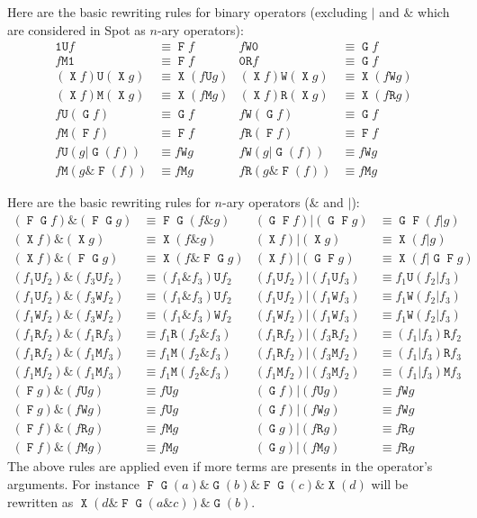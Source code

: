 \documentclass[a4paper,twoside,10pt,DIV=12,draft]{scrreprt}
\DeclareMathOperator{\F}{\texttt{F}}
\DeclareMathOperator{\G}{\texttt{G}}
\newcommand{\U}{\mathbin{\texttt{U}}}
\newcommand{\R}{\mathbin{\texttt{R}}}
\DeclareMathOperator{\X}{\texttt{X}}
\newcommand{\M}{\mathbin{\texttt{M}}}
\newcommand{\W}{\mathbin{\texttt{W}}}
\newcommand{\OR}{\mathbin{\texttt{|}}}
\newcommand{\AND}{\mathbin{\texttt{\&}}}
\newcommand{\0}{\texttt{0}}
\newcommand{\1}{\texttt{1}}
\begin{document}
Here are the basic rewriting rules for binary operators (excluding $\OR$ and
$\AND$ which are considered in Spot as $n$-ary operators):
\begin{align*}
  \1 \U f &\equiv \F f             & f \W \0 &\equiv \G f \\
  f \M \1 &\equiv \F f             & \0 \R f &\equiv \G f \\
  (\X f)\U (\X g) &\equiv \X(f\U g) & (\X f)\W(\X g) &\equiv \X(f\W g) \\
  (\X f)\M (\X g) &\equiv \X(f\M g) & (\X f)\R(\X g) &\equiv \X(f\R g) \\
  f \U(\G f) &\equiv \G f          & f \W(\G f) &\equiv \G f \\
  f \M(\F f) &\equiv \F f          & f \R(\F f) &\equiv \F f \\
  f \U (g \OR \G(f)) &\equiv f\W g & f \W (g \OR \G(f)) &\equiv f\W g\\
  f \M (g \AND \F(f)) &\equiv f\M g & f \R (g \AND \F(f)) &\equiv f\M g
\end{align*}

Here are the basic rewriting rules for $n$-ary operators ($\AND$ and
$\OR$):
\begin{align*}
  (\F\G f) \AND(\F\G g) &\equiv \F\G(f\AND g)     &
  (\G\F f) \OR (\G\F g) &\equiv \G\F(f\OR g)      \\
  (\X f) \AND(\X g)     &\equiv \X(f\AND g)       &
  (\X f) \OR (\X g)     &\equiv \X(f\OR g)        \\
  (\X f) \AND(\F\G g)   &\equiv \X(f\AND \F\G g)  &
  (\X f) \OR (\G\F g)   &\equiv \X(f\OR \G\F g)   \\
  (f_1 \U f_2)\AND (f_3 \U f_2)&\equiv (f_1\AND f_3)\U f_2&
  (f_1 \U f_2)\OR  (f_1 \U f_3)&\equiv f_1\U (f_2\OR f_3) \\
  (f_1 \U f_2)\AND (f_3 \W f_2)&\equiv (f_1\AND f_3)\U f_2&
  (f_1 \U f_2)\OR  (f_1 \W f_3)&\equiv f_1\W (f_2\OR f_3) \\
  (f_1 \W f_2)\AND (f_3 \W f_2)&\equiv (f_1\AND f_3)\W f_2&
  (f_1 \W f_2)\OR  (f_1 \W f_3)&\equiv f_1\W (f_2\OR f_3) \\
  (f_1 \R f_2)\AND (f_1 \R f_3)&\equiv f_1\R (f_2\AND f_3)&
  (f_1 \R f_2)\OR  (f_3 \R f_2)&\equiv (f_1\OR f_3) \R f_2\\
  (f_1 \R f_2)\AND (f_1 \M f_3)&\equiv f_1\M (f_2\AND f_3)&
  (f_1 \R f_2)\OR  (f_3 \M f_2)&\equiv (f_1\OR f_3) \R f_3\\
  (f_1 \M f_2)\AND (f_1 \M f_3)&\equiv f_1\M (f_2\AND f_3)&
  (f_1 \M f_2)\OR  (f_3 \M f_2)&\equiv (f_1\OR f_3) \M f_3\\
  (\F g)\AND (f \U g)&\equiv f\U g &
  (\G f)\OR  (f \U g)&\equiv f\W g \\
  (\F g)\AND (f \W g)&\equiv f\U g &
  (\G f)\OR  (f \W g)&\equiv f\W g \\
  (\F f)\AND (f \R g)&\equiv f\M g &
  (\G g)\OR  (f \R g)&\equiv f\R g \\
  (\F f)\AND (f \M g)&\equiv f\M g &
  (\G g)\OR  (f \M g)&\equiv f\R g
\end{align*}
The above rules are applied even if more terms are presents in the
operator's arguments.  For instance $\F\G(a)\AND \G(b) \AND \F\G(c) \AND
\X(d)$ will be rewritten as $\X(d \AND \F\G(a\AND c))\AND \G(b)$.
\end{document}
